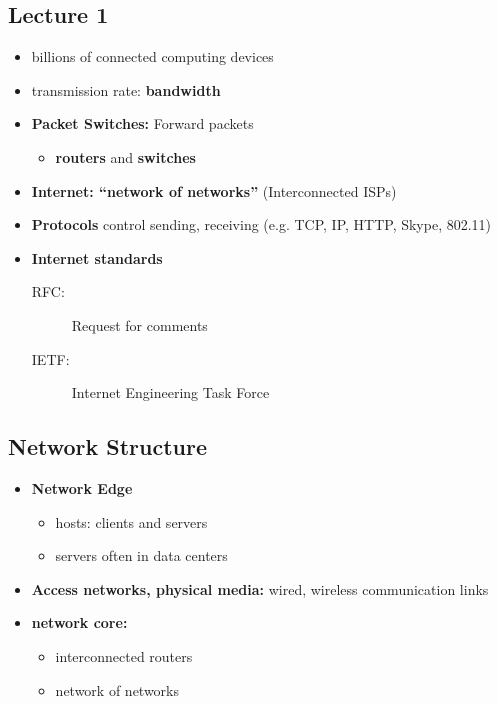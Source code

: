 \documentclass[12pt, a4paper]{article}
\begin{document}
\newpage
\begin{multicols*}{2}
	
	\section{Lecture 1}
	\begin{itemize}
		\item billions of connected computing devices
		\item transmission rate: \textbf{bandwidth}
		\item \textbf{Packet Switches:} Forward packets
		\begin{itemize}
			\item \textbf{routers} and \textbf{switches}
		\end{itemize}
		\item \textbf{Internet: ``network of networks''} (Interconnected ISPs)
		\item \textbf{Protocols} control sending, receiving (e.g. TCP, IP, HTTP, Skype, 802.11)
		\item \textbf{Internet standards}
		\begin{description}
			\item[RFC:] Request for comments
			\item[IETF:] Internet Engineering Task Force
		\end{description}
	\end{itemize}

\subsection{Network Structure}
\begin{itemize}
	\item \textbf{Network Edge}
	\begin{itemize}
		\item hosts: clients and servers
		\item servers often in data centers
	\end{itemize}
	\item \textbf{Access networks, physical media:} wired, wireless communication links
	\item \textbf{network core:}
	\begin{itemize}
		\item interconnected routers
		\item network of networks
	\end{itemize}
\end{itemize}


\end{multicols*}
\end{document}
